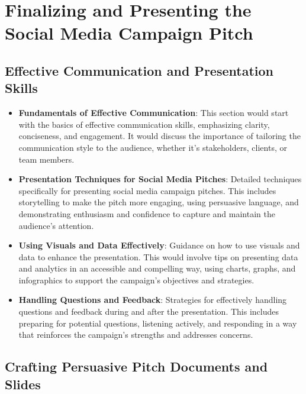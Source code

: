 \documentclass[
]{book}
\providecommand{\tightlist}{%
  \setlength{\itemsep}{0pt}\setlength{\parskip}{0pt}}
\begin{document}
\hypertarget{finalizing-and-presenting-the-social-media-campaign-pitch}{%
\chapter{Finalizing and Presenting the Social Media Campaign Pitch}\label{finalizing-and-presenting-the-social-media-campaign-pitch}}

\hypertarget{effective-communication-and-presentation-skills}{%
\section*{Effective Communication and Presentation Skills}\label{effective-communication-and-presentation-skills}}

\begin{itemize}
\tightlist
\item
  \textbf{Fundamentals of Effective Communication}: This section would start with the basics of effective communication skills, emphasizing clarity, conciseness, and engagement. It would discuss the importance of tailoring the communication style to the audience, whether it's stakeholders, clients, or team members.
\item
  \textbf{Presentation Techniques for Social Media Pitches}: Detailed techniques specifically for presenting social media campaign pitches. This includes storytelling to make the pitch more engaging, using persuasive language, and demonstrating enthusiasm and confidence to capture and maintain the audience's attention.
\item
  \textbf{Using Visuals and Data Effectively}: Guidance on how to use visuals and data to enhance the presentation. This would involve tips on presenting data and analytics in an accessible and compelling way, using charts, graphs, and infographics to support the campaign's objectives and strategies.
\item
  \textbf{Handling Questions and Feedback}: Strategies for effectively handling questions and feedback during and after the presentation. This includes preparing for potential questions, listening actively, and responding in a way that reinforces the campaign's strengths and addresses concerns.
\end{itemize}

\hypertarget{crafting-persuasive-pitch-documents-and-slides}{%
\section*{Crafting Persuasive Pitch Documents and Slides}\label{crafting-persuasive-pitch-documents-and-slides}}
\end{document}
